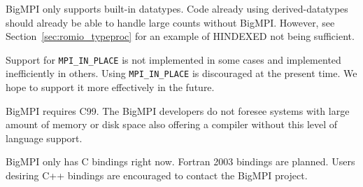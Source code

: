 BigMPI only supports built-in datatypes.  Code already using
derived-datatypes should already be able to handle large counts without BigMPI\@.
However, see Section~\ref{sec:romio_typeproc} for an example of HINDEXED not
being sufficient.

Support for \texttt{MPI\_IN\_PLACE} is not implemented in some cases and
implemented inefficiently in others.
Using \texttt{MPI\_IN\_PLACE} is discouraged at the present time.
We hope to support it more effectively in the future.

BigMPI requires C99.  The BigMPI developers do not foresee systems with large
amount of memory or disk space also offering a compiler without this level of language support.

BigMPI only has C bindings right now.
Fortran 2003 bindings are planned.
Users desiring C++ bindings are encouraged to contact the BigMPI project.
